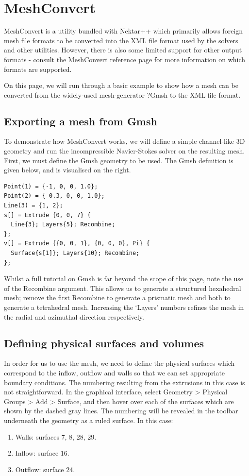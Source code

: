 \section{MeshConvert}
\label{s:utilities:meshconvert}

MeshConvert is a utility bundled with Nektar++ which primarily allows foreign mesh file formats to be converted into the XML file format used by the solvers and other utilities. However, there is also some limited support for other output formats - consult the MeshConvert reference page for more information on which formats are supported.

On this page, we will run through a basic example to show how a mesh can be converted from the widely-used mesh-generator ?Gmsh to the XML file format.


\subsection{Exporting a mesh from Gmsh}

To demonstrate how MeshConvert works, we will define a simple channel-like 3D geometry and run the incompressible Navier-Stokes solver on the resulting mesh. First, we must define the Gmsh geometry to be used. The Gmsh definition is given below, and is visualised on the right.


\begin{lstlisting}[style=XmlStyle]
Point(1) = {-1, 0, 0, 1.0};
Point(2) = {-0.3, 0, 0, 1.0};
Line(3) = {1, 2};
s[] = Extrude {0, 0, 7} {
  Line{3}; Layers{5}; Recombine;
};
v[] = Extrude {{0, 0, 1}, {0, 0, 0}, Pi} {
  Surface{s[1]}; Layers{10}; Recombine;
};
\end{lstlisting}
Whilst a full tutorial on Gmsh is far beyond the scope of this page, note the use of the Recombine argument. This allows us to generate a structured hexahedral mesh; remove the first Recombine to generate a prismatic mesh and both to generate a tetrahedral mesh. Increasing the `Layers' numbers refines the mesh in the radial and azimuthal direction respectively.
\subsection{Defining physical surfaces and volumes}

In order for us to use the mesh, we need to define the physical surfaces which correspond to the inflow, outflow and walls so that we can set appropriate boundary conditions. The numbering resulting from the extrusions in this case is not straightforward. In the graphical interface, select Geometry > Physical Groups > Add > Surface, and then hover over each of the surfaces which are shown by the dashed gray lines. The numbering will be revealed in the toolbar underneath the geometry as a ruled surface. In this case:
\begin{enumerate}
\item Walls: surfaces 7, 8, 28, 29.
\item Inflow: surface 16.
\item Outflow: surface 24.
\end{enumerate}

